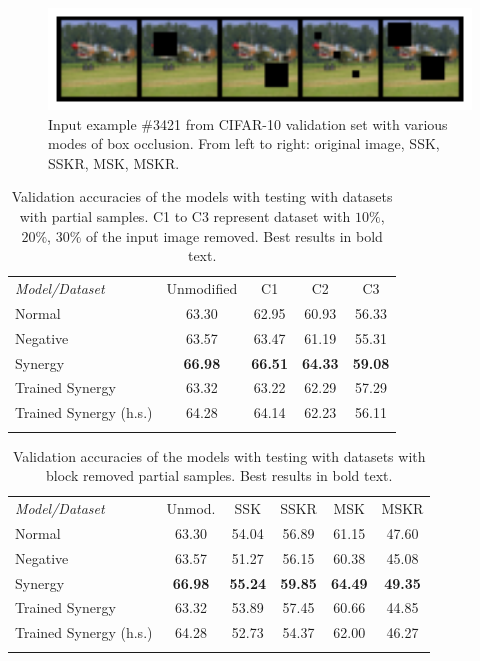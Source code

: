\documentclass[b5paper]{book}
\begin{document}
\begin{figure}
    \centering
    \includegraphics[width=1\textwidth]{figures/fig4.png}
\caption{Input example \#3421 from CIFAR-10 validation set with various modes of box occlusion. From left to right: original image, SSK, SSKR, MSK, MSKR.}
\label{fig:4} 
\end{figure}

\begin{table}
\centering
\caption{Validation accuracies of the models with testing with datasets with partial samples. C1 to C3 represent dataset with \( 10\% \), \( 20\% \), \( 30\% \) of the input image removed. Best results in bold text.}
\label{tab:8}
\tabcolsep=0.06cm
\begin{tabular}{lcccc}
\hline\noalign{\smallskip}
\emph{Model/Dataset} & Unmodified & C1 & C2 & C3 \\
\noalign{\smallskip}\hline\noalign{\smallskip}
Normal & 63.30 & 62.95 & 60.93 & 56.33 \\
Negative & 63.57 & 63.47 & 61.19 & 55.31 \\
Synergy & \textbf{66.98} & \textbf{66.51} & \textbf{64.33} & \textbf{59.08}\\
Trained Synergy & 63.32 & 63.22 & 62.29 & 57.29\\
Trained Synergy (h.s.) & 64.28 & 64.14 & 62.23 & 56.11\\
\noalign{\smallskip}\hline
\end{tabular}
\end{table}

\begin{table}
\centering
\caption{Validation accuracies of the models with testing with datasets with block removed partial samples. Best results in bold text.}
\label{tab:9}
\tabcolsep=0.06cm
\begin{tabular}{lccccc}
\hline\noalign{\smallskip}
\emph{Model/Dataset} & Unmod. & SSK & SSKR & MSK & MSKR \\
\noalign{\smallskip}\hline\noalign{\smallskip}
Normal & 63.30 & 54.04 & 56.89 & 61.15 & 47.60 \\
Negative & 63.57 & 51.27 & 56.15 & 60.38 & 45.08 \\
Synergy & \textbf{66.98} & \textbf{55.24} & \textbf{59.85} & \textbf{64.49} & \textbf{49.35}\\
Trained Synergy & 63.32 & 53.89 & 57.45 & 60.66 & 44.85\\
Trained Synergy (h.s.) & 64.28 & 52.73 & 54.37 & 62.00 & 46.27 \\
\noalign{\smallskip}\hline
\end{tabular}
\end{table}
\end{document}
